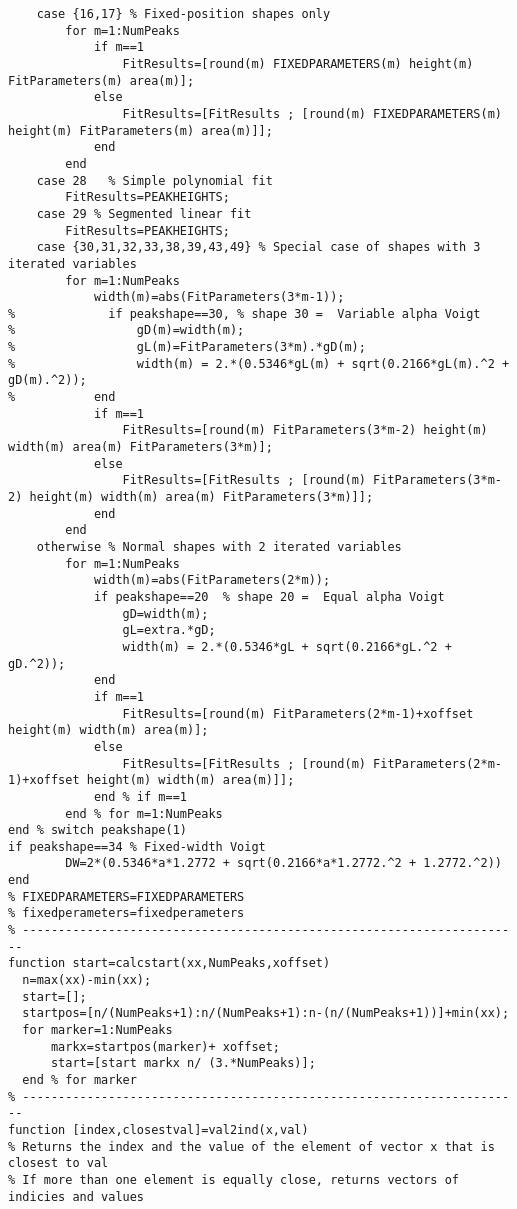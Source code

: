 \begin{lstlisting}
    case {16,17} % Fixed-position shapes only
        for m=1:NumPeaks
            if m==1
                FitResults=[round(m) FIXEDPARAMETERS(m) height(m) FitParameters(m) area(m)];
            else
                FitResults=[FitResults ; [round(m) FIXEDPARAMETERS(m) height(m) FitParameters(m) area(m)]];
            end
        end
    case 28   % Simple polynomial fit
        FitResults=PEAKHEIGHTS;
    case 29 % Segmented linear fit
        FitResults=PEAKHEIGHTS;
    case {30,31,32,33,38,39,43,49} % Special case of shapes with 3 iterated variables
        for m=1:NumPeaks
            width(m)=abs(FitParameters(3*m-1));
%             if peakshape==30, % shape 30 =  Variable alpha Voigt
%                 gD(m)=width(m);
%                 gL(m)=FitParameters(3*m).*gD(m);
%                 width(m) = 2.*(0.5346*gL(m) + sqrt(0.2166*gL(m).^2 + gD(m).^2));
%           end
            if m==1
                FitResults=[round(m) FitParameters(3*m-2) height(m) width(m) area(m) FitParameters(3*m)];
            else
                FitResults=[FitResults ; [round(m) FitParameters(3*m-2) height(m) width(m) area(m) FitParameters(3*m)]];
            end
        end
    otherwise % Normal shapes with 2 iterated variables
        for m=1:NumPeaks
            width(m)=abs(FitParameters(2*m));
            if peakshape==20  % shape 20 =  Equal alpha Voigt
                gD=width(m);
                gL=extra.*gD;
                width(m) = 2.*(0.5346*gL + sqrt(0.2166*gL.^2 + gD.^2));
            end
            if m==1
                FitResults=[round(m) FitParameters(2*m-1)+xoffset height(m) width(m) area(m)];
            else
                FitResults=[FitResults ; [round(m) FitParameters(2*m-1)+xoffset height(m) width(m) area(m)]];
            end % if m==1
        end % for m=1:NumPeaks
end % switch peakshape(1)
if peakshape==34 % Fixed-width Voigt
        DW=2*(0.5346*a*1.2772 + sqrt(0.2166*a*1.2772.^2 + 1.2772.^2))
end
% FIXEDPARAMETERS=FIXEDPARAMETERS
% fixedperameters=fixedperameters
% ----------------------------------------------------------------------
function start=calcstart(xx,NumPeaks,xoffset)
  n=max(xx)-min(xx);
  start=[];
  startpos=[n/(NumPeaks+1):n/(NumPeaks+1):n-(n/(NumPeaks+1))]+min(xx);
  for marker=1:NumPeaks
      markx=startpos(marker)+ xoffset;
      start=[start markx n/ (3.*NumPeaks)];
  end % for marker
% ----------------------------------------------------------------------
function [index,closestval]=val2ind(x,val)
% Returns the index and the value of the element of vector x that is closest to val
% If more than one element is equally close, returns vectors of indicies and values

\end{lstlisting}
